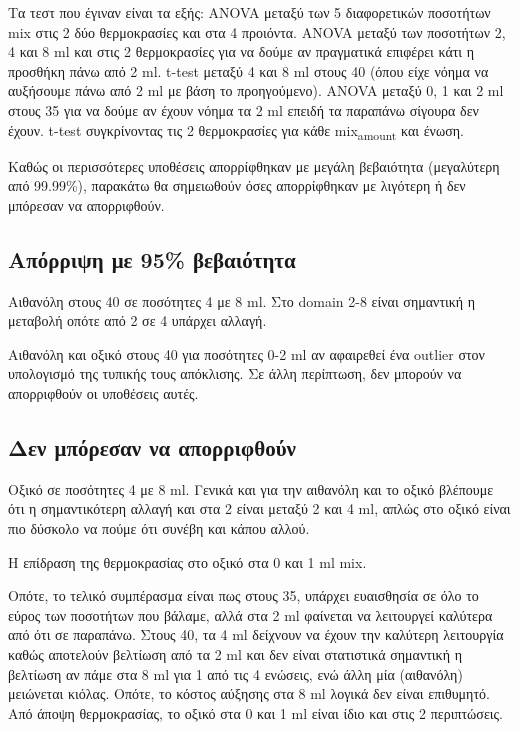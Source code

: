 \documentclass[11pt]{article}
\begin{document}
Τα τεστ που έγιναν είναι τα εξής: ANOVA μεταξύ των 5 διαφορετικών ποσοτήτων mix στις 2 δύο θερμοκρασίες και στα 4 προιόντα. ANOVA μεταξύ των ποσοτήτων 2, 4 και 8 ml και στις 2 θερμοκρασίες για να δούμε αν πραγματικά επιφέρει κάτι η προσθήκη πάνω από 2 ml. t-test μεταξύ 4 και 8 ml στους 40 (όπου είχε νόημα να αυξήσουμε πάνω από 2 ml με βάση το προηγούμενο). ANOVA μεταξύ 0, 1 και 2 ml στους 35 για να δούμε αν έχουν νόημα τα 2 ml επειδή τα παραπάνω σίγουρα δεν έχουν. t-test συγκρίνοντας τις 2 θερμοκρασίες για κάθε mix\textsubscript{amount} και ένωση.

Καθώς οι περισσότερες υποθέσεις απορρίφθηκαν με μεγάλη βεβαιότητα (μεγαλύτερη από 99.99\%), παρακάτω θα σημειωθούν όσες απορρίφθηκαν με λιγότερη ή δεν μπόρεσαν να απορριφθούν.

\subsection{Απόρριψη με 95\% βεβαιότητα}
\label{sec:org23df8b1}
Αιθανόλη στους 40 σε ποσότητες 4 με 8 ml. Στο domain 2-8 είναι σημαντική η μεταβολή οπότε από 2 σε 4 υπάρχει αλλαγή.

Αιθανόλη και οξικό στους 40 για ποσότητες 0-2 ml αν αφαιρεθεί ένα outlier στον υπολογισμό της τυπικής τους απόκλισης. Σε άλλη περίπτωση, δεν μπορούν να απορριφθούν οι υποθέσεις αυτές.

\subsection{Δεν μπόρεσαν να απορριφθούν}
\label{sec:org90ed39d}
Οξικό σε ποσότητες 4 με 8 ml. Γενικά και για την αιθανόλη και το οξικό βλέπουμε ότι η σημαντικότερη αλλαγή και στα 2 είναι μεταξύ 2 και 4 ml, απλώς στο οξικό είναι πιο δύσκολο να πούμε ότι συνέβη και κάπου αλλού.

Η επίδραση της θερμοκρασίας στο οξικό στα 0 και 1 ml mix.

Οπότε, το τελικό συμπέρασμα είναι πως στους 35, υπάρχει ευαισθησία σε όλο το εύρος των ποσοτήτων που βάλαμε, αλλά στα 2 ml φαίνεται να λειτουργεί καλύτερα από ότι σε παραπάνω. Στους 40, τα 4 ml δείχνουν να έχουν την καλύτερη λειτουργία καθώς αποτελούν βελτίωση από τα 2 ml και δεν είναι στατιστικά σημαντική η βελτίωση αν πάμε στα 8 ml για 1 από τις 4 ενώσεις, ενώ άλλη μία (αιθανόλη) μειώνεται κιόλας. Οπότε, το κόστος αύξησης στα 8 ml λογικά δεν είναι επιθυμητό. Από άποψη θερμοκρασίας, το οξικό στα 0 και 1 ml είναι ίδιο και στις 2 περιπτώσεις.
\end{document}
